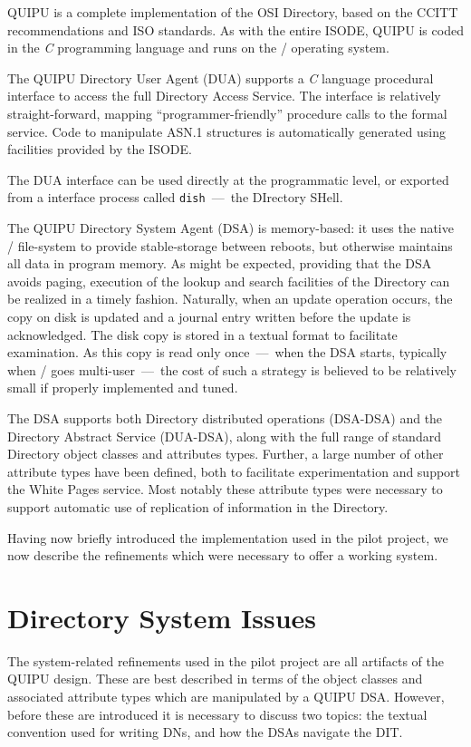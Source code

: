 QUIPU is a complete implementation of the OSI Directory,
based on the {\/} CCITT recommendations\cite{CCITT.Directory}
and ISO standards\cite{ISO.Directory}.
As with the entire ISODE,
QUIPU is coded in the {\em C\/} programming language\cite{C.Language} and runs
on the \unix/ operating system.

The QUIPU Directory User Agent (DUA) supports a {\em C\/} language procedural
interface to access the full Directory Access Service.
The interface is relatively straight-forward,
mapping ``programmer-friendly'' procedure calls to the formal service.
Code to manipulate ASN.1 structures is automatically generated using
facilities provided by the ISODE. 

The DUA interface can be used directly at the programmatic level,
or exported from a interface process called \verb"dish"~---~the DIrectory
SHell.

The QUIPU Directory System Agent (DSA) is memory-based:
it uses the native \unix/ file-system to provide stable-storage between
reboots, but otherwise maintains all data in program memory.
As might be expected,
providing that the DSA avoids paging,
execution of the lookup and search facilities of the Directory can be realized
in a timely fashion.
Naturally, when an update operation occurs,
the copy on disk is updated and a journal entry written before the update is
acknowledged.
The disk copy is stored in a textual format to facilitate examination.
As this copy is read only once~---~when the DSA starts,
typically when \unix/ goes multi-user~---~the cost of such a strategy is
believed to be relatively small if properly implemented and tuned.

The DSA supports both Directory distributed operations (DSA-DSA) and the
Directory Abstract Service (DUA-DSA),
along with the full range of standard Directory object classes and attributes
types.
Further,
a large number of other attribute types have been defined,
both to facilitate experimentation and support the White Pages service.
Most notably these attribute types were necessary to support automatic use of
replication of information in the Directory.

Having now briefly introduced the implementation used in the pilot project,
we now describe the refinements which were necessary to offer a working system.

\newpage
\section	{Directory System Issues}
The system-related refinements used in the pilot project are all artifacts of
the QUIPU design\cite{QUIPU.Design}.
These are best described in terms of the object classes and associated
attribute types which are manipulated by a QUIPU DSA.
However,
before these are introduced it is necessary to discuss two topics:
the textual convention used for writing DNs,
and how the DSAs navigate the DIT.

